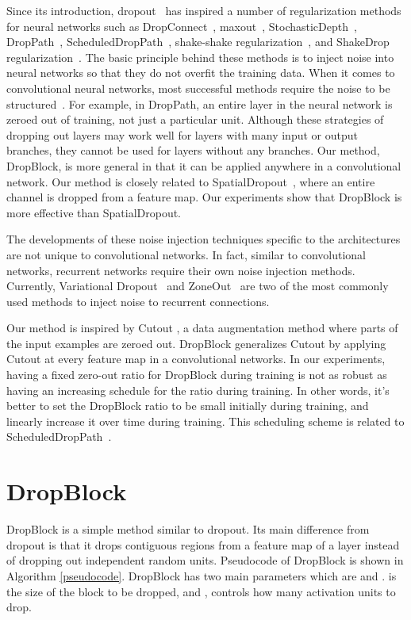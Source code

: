 \documentclass{article}
\begin{document}
Since its introduction, dropout~\cite{dropout2014} has inspired a number of regularization methods for neural networks such as DropConnect~\cite{wan2013regularization}, maxout~\cite{goodfellow2013maxout}, StochasticDepth~\cite{huang2016deep}, DropPath~\cite{fractalnet2017},  ScheduledDropPath~\cite{zoph2017learning}, shake-shake regularization~\cite{gastaldi2017shake}, and ShakeDrop regularization~\cite{yamada2018shakedrop}. The basic principle behind these methods is to inject noise into neural networks so that they do not overfit the training data. When it comes to convolutional neural networks, most successful methods require the noise to be structured~\cite{huang2016deep,fractalnet2017,zoph2017learning,gastaldi2017shake,yamada2018shakedrop,tompson2015spatialdropout}. For example, in DropPath, an entire layer in the neural network is zeroed out of training, not just a particular unit. Although these strategies of dropping out layers may work well for layers with many input or output branches, they cannot be used for layers without any branches. Our method, DropBlock, is more general in that it can be applied anywhere in a convolutional network. Our method is closely related to SpatialDropout~\cite{tompson2015spatialdropout}, where an entire channel is dropped from a feature map. Our  experiments show that DropBlock is more effective than SpatialDropout.

The developments of these noise injection techniques specific to the architectures are not unique to convolutional networks. In fact, similar to convolutional networks, recurrent networks require their own noise injection methods. Currently, Variational Dropout~\cite{gal2016theoretically} and ZoneOut~\cite{krueger2016zoneout} are two of the most commonly used methods to inject noise to recurrent connections.   


Our method is inspired by Cutout \cite{Cutout2017}, a data augmentation method where parts of the input examples are zeroed out. DropBlock generalizes Cutout by applying Cutout at every feature map in a convolutional networks. In our experiments, having a fixed zero-out ratio for DropBlock during training is not as robust as having an increasing schedule for the ratio during training. In other words, it's better to set the DropBlock ratio to be small initially during training, and linearly increase it over time during training. This scheduling scheme is related to ScheduledDropPath~\cite{zoph2017learning}.

\section{DropBlock}
DropBlock is a simple method similar to dropout. Its main difference from dropout is that it drops contiguous regions from a feature map of a layer instead of dropping out independent random units. Pseudocode of  DropBlock is shown in Algorithm
\ref{pseudocode}.
DropBlock has two main parameters which are  and .  is the size of the block to be dropped, and , controls how many activation units to drop. 
\end{document}
